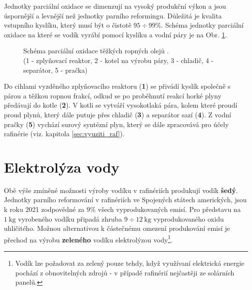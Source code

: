 Jednotky parciální oxidace se dimenzují na vysoký produkční výkon a jsou úspornější a levnější než jednotky parního reformingu. Důležitá je kvalita vstupního kyslíku, který musí být o čistotě $95 \div 99\%$. \cite{Seddon2022,Blazek2006} Schéma jednotky parciální oxidace na které se vodík vyrábí pomocí kyslíku a vodní páry je na Obr. \ref{fig:schema_pox}.
\begin{figure}[h]
    \centering
    
    \caption[Schéma parciální oxidace těžkých ropných olejů]{Schéma parciální oxidace těžkých ropných olejů \cite{Blazek2006}.\\(1 - zplyňovací reaktor, 2 - kotel na výrobu páry, 3 - chladič, 4 - separátor, 5 - pračka)} \label{fig:schema_pox}
\end{figure}

\noindent
Do cihlami vyzděného zplyňovacího reaktoru (\textbf{1}) se přivádí kyslík společně s párou a těžkou ropnou frakcí, odkud se po proběhnutí reakcí horké plyny předávají do kotle (\textbf{2}). V kotli se vytváří vysokotlaká pára, kolem které proudí proud plynů, který dále putuje přes chladič (\textbf{3}) a separátor sazí (\textbf{4}). Z vodní pračky (\textbf{5}) vychází surový syntézní plyn, který se dále zpracovává pro účely rafinérie (viz. kapitola \ref{sec:vyuziti_raf}). \cite{Seddon2022,Blazek2006}

\section{Elektrolýza vody}

Obě výše zmíněné možnosti výroby vodíku v rafinériích produkují vodík \textbf{šedý}. Jednotky parního reformování v rafinériích ve Spojených státech amerických, jsou k roku 2021 zodpovědné za $9\%$ všech vyprodukovaných emisí. Pro představu na $1\ \mathrm{kg}$ vyrobeného vodíku připadá zhruba $9 \div 12\ \mathrm{kg}$ vyprodukovaného oxidu uhličitého. \cite{Hytep} Možnou alternativou k částečnému omezení produkování emisí je přechod na výrobu \textbf{zeleného} vodíku elektrolýzou vody\footnote{Vodík lze požadovat za zelený pouze tehdy, když využívaní elektrická energie pochází z obnovitelných zdrojů - v případě rafinérií nejčastěji ze solárních panelů.}.

